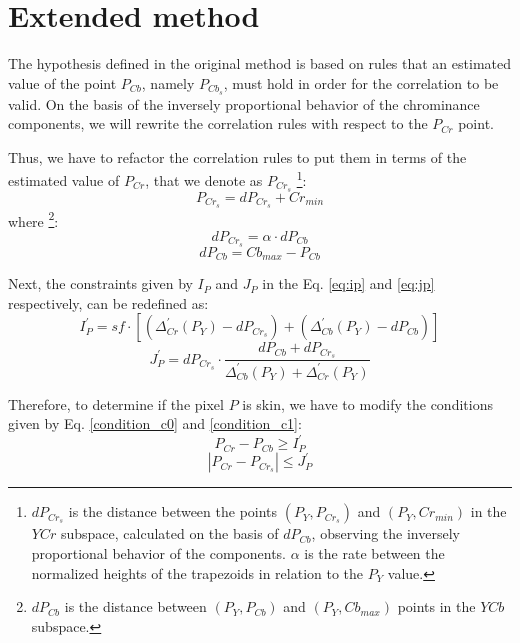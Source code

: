 \section{Extended method}
\label{sec:proposed_method}
The hypothesis defined in the original method is based on rules that an estimated value of the point $P_{Cb}$, namely $P_{Cb_s}$, must hold in order for the correlation to be valid. On the basis of the inversely proportional behavior of the chrominance components, we will rewrite the correlation rules with respect to the $P_{Cr}$ point.

Thus, we have to refactor the correlation rules to put them in terms of the estimated value of $P_{Cr}$, that we denote as $P_{Cr_s}$ \footnote{$dP_{Cr_s}$ is the distance between the points $(P_Y, P_{Cr_s})$ and $(P_Y, Cr_{min})$ in the $YCr$ subspace, calculated on the basis of $dP_{Cb}$, observing the inversely proportional behavior of the components. $\alpha$ is the rate between the normalized heights of the trapezoids in relation to the $P_Y$ value.}:
\begin{equation}
    P_{Cr_s} = dP_{Cr_s} + Cr_{min}
\end{equation}
where \footnote{$dP_{Cb}$ is the distance between $(P_Y, P_{Cb})$ and $(P_Y, Cb_{max})$ points in the $YCb$ subspace.}:
\begin{equation}
    dP_{Cr_s} = \alpha \cdot dP_{Cb}
\end{equation}
\begin{equation}
    dP_{Cb}   = Cb_{max} - P_{Cb}
\end{equation}

Next, the constraints given by $I_P$ and $J_P$ in the Eq. \ref{eq:ip} and \ref{eq:jp} respectively, can be redefined as:
\begin{equation}
    I^{'}_P = sf \cdot [(\Delta^{'}_{Cr}(P_Y) - dP_{Cr_s}) + (\Delta^{'}_{Cb}(P_Y) - dP_{Cb})]
\end{equation}
\begin{equation}
    J^{'}_P = dP_{Cr_s} \cdot \frac{dP_{Cb} + dP_{Cr_s}} {\Delta^{'}_{Cb}(P_Y) + \Delta^{'}_{Cr}(P_Y)}
\end{equation}

Therefore, to determine if the pixel $P$ is skin, we have to modify the conditions given by Eq. \ref{condition_c0} and \ref{condition_c1}:
\begin{equation}
    P_{Cr} - P_{Cb} \geq I^{'}_P
\label{condition_c00}
\end{equation}
\begin{equation}
   |P_{Cr} - P_{Cr_s}| \leq J^{'}_P
\label{condition_c11}
\end{equation}

